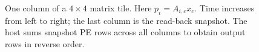 \begin{figure}[t]
  \centering
  
  \caption{One column of a $4\times4$ matrix tile. Here $p_i=A_{i,c}x_c$.
  Time increases from left to right; the last column is the read-back snapshot.
  The host sums snapshot PE rows across all columns to obtain output rows in
  reverse order.}
  \label{fig:systolic}
\end{figure}
